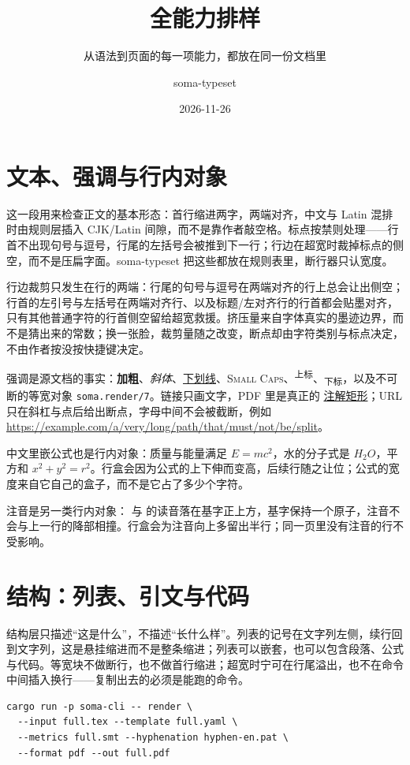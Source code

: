 \documentclass{article}
\title{全能力排样}
\subtitle{从语法到页面的每一项能力，都放在同一份文档里}
\author{soma-typeset}
\date{2026-11-26}
\newcommand{\engine}{\textsf{soma-typeset}}
\begin{document}
\section{文本、强调与行内对象}

这一段用来检查正文的基本形态：首行缩进两字，两端对齐，中文与 Latin 混排时由规则层插入 CJK/Latin 间隙，而不是靠作者敲空格。标点按禁则处理——行首不出现句号与逗号，行尾的左括号会被推到下一行；行边在超宽时裁掉标点的侧空，而不是压扁字面。\engine{} 把这些都放在规则表里，断行器只认宽度。

行边裁剪只发生在行的两端：行尾的句号与逗号在两端对齐的行上总会让出侧空；行首的左引号与左括号在两端对齐行、以及标题/左对齐行的行首都会贴墨对齐，只有其他普通字符的行首侧空留给超宽救援。挤压量来自字体真实的墨迹边界，而不是猜出来的常数；换一张脸，裁剪量随之改变，断点却由字符类别与标点决定，不由作者按没按快捷键决定。

强调是源文档的事实：\textbf{加粗}、\emph{斜体}、\underline{下划线}、\textsc{Small Caps}、\textsuperscript{上标}、\textsubscript{下标}，以及不可断的等宽对象 \texttt{soma.render/7}。链接只画文字，PDF 里是真正的 \href{https://example.com/soma}{注解矩形}；URL 只在斜杠与点后给出断点，字母中间不会被截断，例如 \url{https://example.com/a/very/long/path/that/must/not/be/split}。

中文里嵌公式也是行内对象：质量与能量满足 $E = mc^2$，水的分子式是 $H_2O$，平方和 $x^2 + y^2 = r^2$。行盒会因为公式的上下伸而变高，后续行随之让位；公式的宽度来自它自己的盒子，而不是它占了多少个字符。

注音是另一类行内对象： 与  的读音落在基字正上方，基字保持一个原子，注音不会与上一行的降部相撞。行盒会为注音向上多留出半行；同一页里没有注音的行不受影响。

\section{结构：列表、引文与代码}

结构层只描述“这是什么”，不描述“长什么样”。列表的记号在文字列左侧，续行回到文字列，这是悬挂缩进而不是整条缩进；列表可以嵌套，也可以包含段落、公式与代码。等宽块不做断行，也不做首行缩进；超宽时宁可在行尾溢出，也不在命令中间插入换行——复制出去的必须是能跑的命令。

\begin{verbatim}
cargo run -p soma-cli -- render \
  --input full.tex --template full.yaml \
  --metrics full.smt --hyphenation hyphen-en.pat \
  --format pdf --out full.pdf
\end{verbatim}
\end{document}
